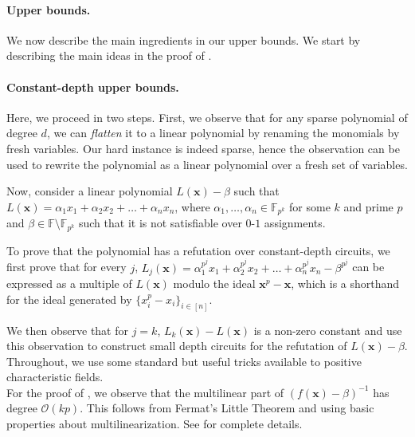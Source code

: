 \documentclass[11pt]{article}
\newcommand{\bigO}{\mathcal{O}}
\newcommand{\xbar}{\mathbf{x}}
\begin{document}
\paragraph{Upper bounds.}
We now describe the main ingredients in our upper bounds. We start by describing the main ideas in the proof of . 

\paragraph{Constant-depth upper bounds.} Here, we proceed in two steps. First, we observe that for any sparse polynomial of degree $d$, we can \emph{flatten} it to a linear polynomial by renaming the monomials by fresh variables. Our hard instance is indeed sparse, hence the observation can be used to rewrite the polynomial as a linear polynomial over a fresh set of variables. 

Now, consider a linear polynomial $L(\xbar) - \beta$ such that $L(\xbar) = \alpha_1 x_1 + \alpha_2 x_2 + \ldots + \alpha_n x_n$, where $\alpha_1, \ldots, \alpha_n \in \mathbb{F}_{p^k}$ for some $k$ and prime $p$ and $\beta \in \mathbb{F}\setminus \mathbb{F}_{p^k}$ such that it is not satisfiable over $0$-$1$ assignments. 


To prove that the polynomial has a refutation over constant-depth circuits, we first prove that for every $j$, $L_j(\xbar) = \alpha_1^{p^j} x_1 + \alpha_2^{p^j} x_2 + \ldots + \alpha_n^{p^j} x_n -  \beta^{p^{j}}$ can be expressed as a multiple of $L(\xbar)$ modulo the ideal $\xbar^p - \xbar$, which is a shorthand for the ideal generated by $\{x_i^p - x_i\}_{i \in [n]}$. 

We then observe that for $j =k$, $L_k(\xbar) - L(\xbar)$ is a non-zero constant and use this observation to construct small depth circuits for the refutation of $L(\xbar) - \beta$. Throughout, we use some standard but useful tricks available to positive characteristic fields.\\

For the proof of , we observe that the multilinear part of $(f(\mathbf{x})-\beta)^{-1}$ has degree $\bigO(kp)$. This follows from Fermat's Little Theorem and using basic properties about multilinearization. See  for complete details.
\end{document}
